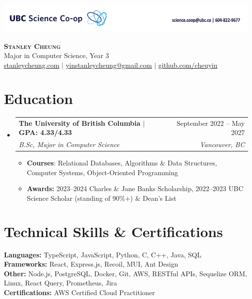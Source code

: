 \documentclass[letterpaper]{article}
\makeatletter
\newcommand{\resumeItem}[1]{
  \item\small{
    {#1 \vspace{-2pt}}
  }
}
\newcommand{\resumeSubheading}[4]{
  \vspace{-2pt}\item
    \begin{tabular*}{0.97\textwidth}[t]{l@{\extracolsep{\fill}}r}
      \textbf{#1} & #2 \\
      \textit{\small#3} & \textit{\small #4} \\
    \end{tabular*}\vspace{-7pt}
}
\newcommand{\resumeSubHeadingListStart}{\begin{itemize}[leftmargin=0.15in, label={}]}
\newcommand{\resumeSubHeadingListEnd}{\end{itemize}}
\newcommand{\resumeItemListStart}{\begin{itemize}}
\newcommand{\resumeItemListEnd}{\end{itemize}\vspace{-5pt}}
\makeatother
\begin{document}
\noindent\includegraphics[width=\textwidth]{assets/coop-banner.png}

\begin{center}
    \color{NavyBlue}
    \textbf{\huge \scshape Stanley Cheung} \\ 
    \vspace{5pt}
    \color{black}
    {\large Major in Computer Science, Year 3} \\
    \vspace{5pt}    
		\href{https://stanleycheung.com}{\underline{stanleycheung.com}} $|$
    \href{mailto:yinstanleycheung@gmail.com}{\underline{yinstanleycheung@gmail.com}} $|$ 
    \href{https://github.com/cheuyin}{\underline{github.com/cheuyin}}
\end{center}

\color{NavyBlue}
\section{Education}
\color{black}
  \resumeSubHeadingListStart
    \resumeSubheading
      {The University of British Columbia $|$ GPA: 4.33/4.33}{September 2022 -- May 2027}
      {B.Sc, Major in Computer Science}{Vancouver, BC}
      \resumeItemListStart 
        \resumeItem{\textbf{Courses}: Relational Databases, Algorithms \& Data Structures, Computer Systems, Object-Oriented Programming}
        \resumeItem{\textbf{Awards:} 2023--2024 Charles \& Jane Banks Scholarship, 2022--2023 UBC Science Scholar (standing of 90\%+) \& Dean's List}
      \resumeItemListEnd 
  \resumeSubHeadingListEnd

\color{NavyBlue}
\section{Technical Skills \& Certifications}
\color{Black}
 \begin{itemize}[leftmargin=0.15in, label={}]
    \small{\item{
        \textbf{Languages:}{ TypeScript, JavaScript, Python, C, C++, Java, SQL} \\
        \textbf{Frameworks:}{ React, Express.js, Recoil, MUI, Ant Design} \\
        \textbf{Other:}{ Node.js, PostgreSQL, Docker, Git, AWS, RESTful APIs, Sequelize ORM, Linux, React Query, Prometheus, Jira} \\
        \textbf{Certifications:}{ AWS Certified Cloud Practitioner}
    }}
 \end{itemize}
\end{document}
